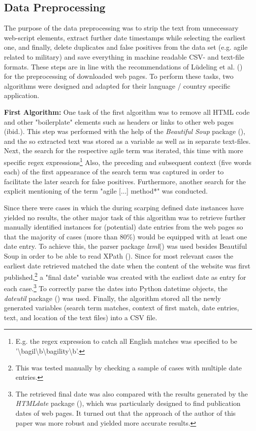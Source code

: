 \subsection{Data Preprocessing}
The purpose of the data  preprocessing was to strip the text from unnecessary web-script elements, extract further date timestamps while selecting the earliest one, and finally, delete duplicates and false positives from the data set (e.g. agile related to military) and save everything in machine readable CSV- and text-file formats. These steps are in line with the recommendations of Lüdeling et al. (\cite*[p. 19]{Ludeling2015}) for the preprocessing of downloaded web pages. To perform these tasks, two algorithms were designed and adapted for their language / country specific application. \par 
\textbf{First Algorithm:} One task of the first algorithm was to remove all HTML code and other "boilerplate" elements such as headers or links to other web pages (ibid.). This step was performed with the help of the \textit{Beautiful Soup} package (\cite{Richardson2007}), and the so extracted text was stored as a variable as well as in separate text-files. Next, the search for the respective agile term was iterated, this time with more specific regex expressions\footnote{E.g. the regex expression to catch all English matches was specified to be '\textbackslash bagil\textbackslash b\textbar \textbackslash bagility\textbackslash b'.} Also, the preceding and subsequent context (five words each) of the first appearance of the search term was captured in order to facilitate the later search for false positives. Furthermore, another search for the explicit mentioning of the term "agile [...] method*" was conducted.\par 
Since there were cases in which the during scarping defined date instances have yielded no results, the other major task of this algorithm was to retrieve further manually identified instances for (potential) date entries from the web pages so that the majority of cases (more than 80\%) would be equipped with at least one date entry. To achieve this, the parser package \textit{lxml}(\cite{Faassen2006}) was used besides Beautiful Soup in order to be able to read XPath (\cite{Clark1999}). Since for most relevant cases the earliest date retrieved matched the date when the content of the website was first published,\footnote{This was tested manually by checking a sample of cases with multiple date entries.} a "final date" variable was created with the earliest date as entry for each case.\footnote{The retrieved final date was also compared with the results generated by the \textit{HTMLdate} package (\cite{Barbaresi2020}), which was particularly designed to find publication dates of web pages. It turned out that the approach of the author of this paper was more robust and yielded more accurate results.} To correctly parse the dates into Python datetime objects, the \textit{dateutil} package (\cite{Niemeyer2003}) was used. Finally, the algorithm stored all the newly generated variables (search term matches, context of first match, date entries, text, and location of the text files) into a CSV file.\par
